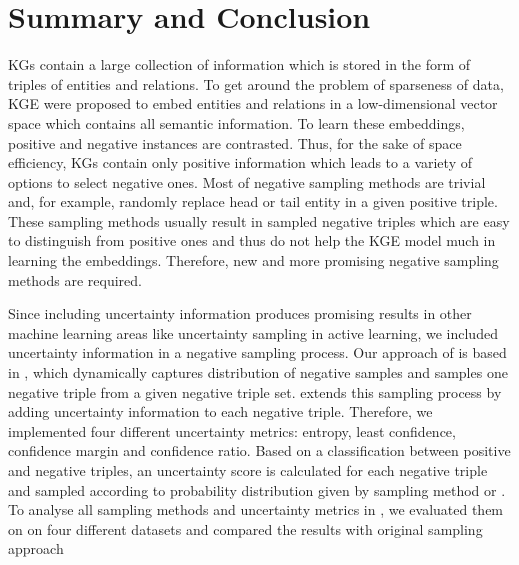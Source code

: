 \section{Summary and Conclusion}  
\label{sec:summary_and_conclusion}

\acp{KG} contain a large collection of information which is stored in the form of triples of entities and relations.
To get around the problem of sparseness of data, \ac{KGE} were proposed to embed entities and relations in a low-dimensional vector space which contains all semantic information.
To learn these embeddings, positive and negative instances are contrasted.
Thus, for the sake of space efficiency, \acp{KG} contain only positive information which leads to a variety of options to select negative ones.
Most of negative sampling methods are trivial and, for example, randomly replace head or tail entity in a given positive triple.
These sampling methods usually result in sampled negative triples which are easy to distinguish from positive ones and thus do not help the \ac{KGE} model much in learning the embeddings. 
Therefore, new and more promising negative sampling methods are required.

Since including uncertainty information produces promising results in other machine learning areas like uncertainty sampling in active learning, we included uncertainty information in a negative sampling process.
Our approach of \usgan is based in \kbgan, which dynamically captures distribution of negative samples and samples one negative triple from a given negative triple set.
\usgan extends this sampling process by adding uncertainty information to each negative triple.
Therefore, we implemented four different uncertainty metrics: entropy, least confidence, confidence margin and confidence ratio.
Based on a classification between positive and negative triples, an uncertainty score is calculated for each negative triple and sampled according to probability distribution given by sampling method \ussoftmax or \usmax.
To analyse all sampling methods and uncertainty metrics in \usgan, we evaluated them on on four different datasets and compared the results with original \kbgan sampling approach 


